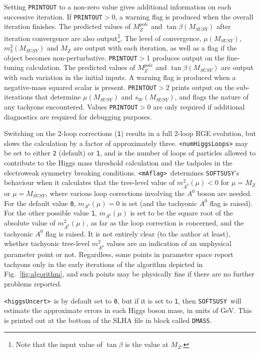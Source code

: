 \documentclass{article}
\def\SOFTSUSY{{\tt SOFTSUSY}}
\def\code#1{\small{\tt #1}\normalsize}
\begin{document}
Setting \code{PRINTOUT} to a non-zero value gives additional information
on 
each successive iteration. If \code{PRINTOUT}$>$0, a warning flag is
produced when the overall iteration 
finishes. The predicted values of $M_Z^{pole}$ and $\tan \beta(M_{SUSY})$ after
iteration convergence
are also output\footnote{Note that the input value of $\tan \beta$ is the
value at $M_Z$.}. The level of convergence, $\mu(M_{SUSY})$, $m_3^2(M_{SUSY})$ and $M_Z$
are output with each iteration, as well as a flag if the object becomes
non-perturbative. 
\code{PRINTOUT}$>$1 produces output on the fine-tuning calculation. The
predicted values of $M_Z^{pole}$ and $\tan \beta(M_{SUSY})$ are output with each
variation 
in the initial inputs. A warning flag is produced when a
negative-mass squared scalar is present.
\code{PRINTOUT}$>$2 prints output on the sub-iterations that determine
$\mu(M_{SUSY})$ and $s_W(M_{SUSY})$, and flags the nature of any tachyons
encountered. Values \code{PRINTOUT}$>$0 are only required
if additional diagnostics are required for debugging purposes.

Switching on the 2-loop
corrections (\code{1})
results in a full 2-loop RGE evolution, but slows the calculation by a factor 
of approximately three.
\code{<numHiggsLoops>} may be set to either \code{2} (default) or \code{1},
and is the number of loops of particles allowed to contribute to the Higgs
mass threshold calculation and the tadpoles in the electroweak symmetry
breaking conditions.
\code{<mAflag>}~determines \SOFTSUSY's behaviour when it calculates that the
tree-level value of $m_{A^0}^2(\mu)<0$ for $\mu=M_Z$ or $\mu=M_{SUSY}$, where
various loop corrections involving the 
$A^0$ boson are needed. For the default value \code{0}, $m_{A^0}(\mu)=0$ is
set (and the tachyonic $A^0$ flag is raised). For the other possible value
\code{1}, $m_{A^0}(\mu)$ is set to be the square root of the absolute value of
$m_{A^0}^2(\mu)$, as far as the loop correction is concerned, and the
tachyonic $A^0$ flag is raised. It is not entirely clear (to the author at
least), whether tachyonic tree-level $m_{A^0}^2$ values are an indication of
an unphysical parameter point or not. Regardless, some points in parameter
space report tachyons only in the 
early iterations of the algorithm depicted in Fig.~\ref{fig:algorithm},
 and such points may
be physically fine if there are no further problems reported. 

\code{<higgsUncert>}~is by default set to \code{0}, but if it is set to
\code{1}, then \SOFTSUSY~will estimate the approximate errors in each Higgs
boson mass, in units of GeV. This is printed out at the bottom of the SLHA
file in block called \code{DMASS}. 
\end{document}
